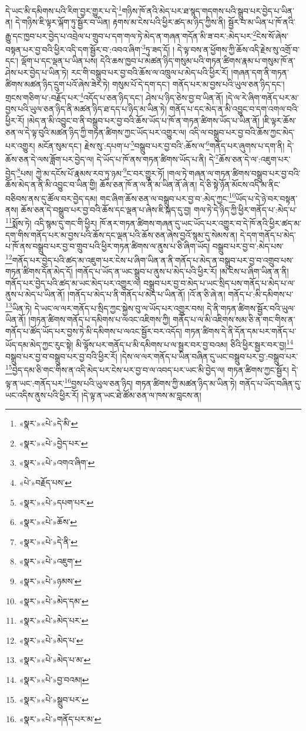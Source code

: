 དེ་ཡང་མི་དམིགས་པའི་རིག་བྱར་གྱུར་པ་དེ་\footnote{«སྣར་»«པེ་»དེ་མི་}གཉིས་ཁོ་ནའི་མེད་པར་ཐ་སྙད་གདགས་པའི་སྒྲུབ་པར་བྱེད་པ་ཡིན་ན། དེ་གཉིས་ཇི་ལྟར་ལྐོག་ཏུ་སྦྱོར་བ་ཡིན། རྟགས་མ་ངེས་པའི་ཕྱིར་ཚད་མ་ཉིད་ཀྱིས་ནི། སྦྱོར་བ་མ་ཡིན་པ་ཁོ་ནའི་རྒྱུ་དང་ཁྱབ་པར་བྱེད་པ་འབྲེལ་པ་གྲུབ་པ་དག་གལ་ཏེ་མེད་ན་གཞན་གདོན་མི་ཟ་བར་:མེད་པར་\footnote{«སྣར་»«པེ་»བྱེད་པར་}ངེས་སོ་ཞེས་བསྟན་པར་བྱ་བའི་ཕྱིར་འདི་དག་སྦྱོར་བ་:འབའ་ཞིག་\footnote{«སྣར་»«པེ་»འགའ་ཞིག་}ཏུ་ཟད་དོ། །
དེ་ལྟ་བས་ན་ཕྱོགས་ཀྱི་ཆོས་འདི་རྗེས་སུ་འགྲོ་བ་དང་། ལྡོག་པ་དང་ལྡན་པ་ཡིན་པས། དེའི་ཆས་ཁྱབ་པ་མཚན་ཉིད་གསུམ་པའི་གཏན་ཚིགས་རྣམ་པ་གསུམ་ཁོ་ན་ཤེས་པར་བྱེད་པ་ཡིན་ཏེ། རང་གི་བསྒྲུབ་པར་བྱ་བའི་ཆོས་ལ་འཁྲུལ་པ་མེད་པའི་ཕྱིར་རོ། །གཞན་དག་ནི་གཏན་ཚིགས་མཚན་ཉིད་དྲུག་པའོ་ཞེས་ཟེར་ཏེ། གསུམ་པོ་དེ་དག་དང་། གནོད་པར་མ་བྱས་པའི་ཡུལ་ཅན་ཉིད་དང་། གྲངས་གཅིག་པ་:བརྗོད་པར་\footnote{«པེ་»བརྗོད་པས་}འདོད་པ་ཅན་ཉིད་དང་། ཤེས་པ་ཉིད་ཅེས་བྱ་བ་ཡིན་ནོ། །དེ་ལ་རེ་ཞིག་གནོད་པར་མ་བྱས་པའི་ཡུལ་ཅན་ཉིད་ནི་མཚན་ཉིད་ཐ་དད་པ་ཉིད་མ་ཡིན་ཏེ། གནོད་པ་དང་མེད་ན་མི་འབྱུང་བ་དག་འགལ་བའི་ཕྱིར་རོ། །མེད་ན་མི་འབྱུང་བ་ནི་བསྒྲུབ་པར་བྱ་བའི་ཆོས་ཡོད་པ་ཁོ་ན་གཏན་ཚིགས་ཡོད་པ་ཡིན་ནོ། །ཇི་ལྟར་ཆོས་ཅན་ལ་དེ་ལྟ་བུའི་མཚན་ཉིད་ཀྱི་གཏན་ཚིགས་ཀྱང་ཡོད་པར་འགྱུར་ལ། འདི་ལ་བསྒྲུབ་པར་བྱ་བའི་ཆོས་ཀྱང་མེད་པར་འགྱུར། མངོན་སུམ་དང་། རྗེས་སུ་:དཔག་པ་\footnote{«སྣར་»«པེ་»དཔག་པར་}བསྒྲུབ་པར་བྱ་བའི་:ཆོས་ལ་\footnote{«སྣར་»«པེ་»ཆོས་}གནོད་པར་ཞུགས་པ་དག་ནི། དེ་ཆོས་ཅན་དེ་ལས་ཟློག་པར་བྱེད་ལ། དེ་ཡོད་པ་ཁོ་ནས་གཏན་ཚིགས་ཡོད་པ་ནི། དེ་\footnote{«སྣར་»«པེ་»དེ་ནི་}ཆོས་ཅན་དེ་ལ་:འཇུག་པར་བྱེད་\footnote{«སྣར་»«པེ་»འཇུག་}པས། ཀྱེ་མ་དངོས་པོ་རྣམས་རབ་ཏུ་ཉམ་\footnote{«སྣར་»«པེ་»ཉམས་}ང་བར་གྱུར་ཏོ། །གལ་ཏེ་གཞན་ལ་གཏན་ཚིགས་བསྒྲུབ་པར་བྱ་བའི་ཆོས་མེད་ན་ནི་མི་འབྱུང་བ་ཡིན་གྱི། ཆོས་ཅན་ཁོ་ན་ལ་ནི་མ་ཡིན་ནོ་ཞེ་ན། དེ་ཅི་སྟེ་ཉོན་མོངས་འདི་མ་ནིང་བཅིབས་ནས་དུ་ཚོལ་བར་བྱེད་དམ། གང་ཞིག་ཆོས་ཅན་ལ་བསྒྲུབ་པར་བྱ་བ་:མེད་ཀྱང་\footnote{«སྣར་»«པེ་»མེད་དམ་}ཡོད་པ་དེ་ཉེ་བར་བསྟན་ནས། ཆོས་ཅན་དེ་བསྒྲུབ་པར་བྱ་བའི་ཆོས་དང་ལྡན་པ་ཞེས་ཇི་སྐད་དུ་བྱ། གལ་ཏེ་དེ་ཉིད་ཀྱི་ཕྱིར་གནོད་པ་:མེད་པ་\footnote{«སྣར་»«པེ་»མེད་པར་}སྨོས་ཏེ། འདི་སྙམ་དུ་གང་གི་ཕྱིར། ཁོ་ནར་གཏན་ཚིགས་གཞན་དུ་ཡང་ཡོད་པར་འགྱུར་བ་དེ་ཁོ་ནའི་ཕྱིར་ཚད་མ་དག་གིས་གནོད་པར་མ་བྱས་པའི་ཆོས་དང་ལྡན་པའི་ཆོས་ཅན་ཞེས་བྱའོ་སྙམ་དུ་སེམས་ན། དེ་དག་གནོད་པ་མེད་པ་ཁོ་ནས་བསྒྲུབ་པར་བྱ་བ་གྲུབ་པའི་ཕྱིར་གཏན་ཚིགས་ལ་ནུས་པ་ཅི་ཞིག་ཡོད། བསྒྲུབ་པར་བྱ་བ་:མེད་པས་\footnote{«སྣར་»«པེ་»མེད་པ་}གནོད་པར་བྱེད་པའི་ཚད་མ་འཇུག་པར་ངེས་པ་ཞིག་ཡིན་ན་ནི་གནོད་པ་མེད་ན་བསྒྲུབ་པར་བྱ་བ་འགྲུབ་པས་གཏན་ཚིགས་དོན་མེད་དོ། །གནོད་པ་ཡོད་ན་ཡང་སྒྲུབ་པ་ནུས་པ་མེད་པའི་ཕྱིར་རོ། །མ་ངེས་པ་ཞིག་ཡིན་ན་ནི། གནོད་པར་བྱེད་པའི་ཚད་མ་ཡང་མེད་པར་འགྱུར་ལ། བསྒྲུབ་པར་བྱ་བ་མེད་པ་ཡང་སྲིད་པས་གནོད་པ་མེད་པ་ལ་ནུས་པ་མེད་པ་ཡིན་ནོ། །གནོད་པ་མེད་པ་ནི་གནོད་པ་མེད་པ་ཡིན་ནོ། །འོ་ན་ཅི་ཞེ་ན། གནོད་པ་:མི་དམིགས་པ་\footnote{«སྣར་»«པེ་»མེད་པ་མ་}ཡིན་ཏེ། དེ་ཡང་ལ་ལར་གནོད་པ་སྲིད་ཀྱང་སྐྱེས་བུ་ལ་ཡོད་པར་འགྱུར་བས། དེ་ནི་གཏན་ཚིགས་སྦྱོར་བའི་ཡུལ་ཡིན་ནོ། །གཏན་ཚིགས་གནོད་པ་དམིགས་པ་ལའང་འཇིགས་ཀྱི། གནོད་པ་ལ་མི་འཇིགས་སམ་ཅི་ན་གང་གིས་ན་གནོད་པ་ཚོད་ཡོད་པར་བྱས་ཏེ་མི་དམིགས་པ་ལའང་སྦྱོར་བར་འདོད། གཏན་ཚིགས་དེ་ནི་དོན་དམ་པར་གནོད་པ་ཡོད་དམ་མེད་ཀྱང་རུང་སྟེ། མི་ལྟོས་པར་གནོད་པ་མི་དམིགས་པ་ལ་སྦྱར་བར་བྱ་བའམ། ཅིའི་ཕྱིར་སྦྱར་བར་བྱ།\footnote{«སྣར་»«པེ་»བྱ་བའམ།} བསྒྲུབ་པར་བྱ་བ་བསྒྲུབ་པར་བྱ་བའི་ཕྱིར་རོ། །དེས་ལ་ལར་གནོད་པ་ཡིན་བཞིན་དུ་ཡང་བསྒྲུབ་པར་བྱ་:བསྒྲུབ་པར་\footnote{«སྣར་»«པེ་»སྒྲུབ་པར་}བྱེད་དམ་ཅི་གང་གིས་ན་འདི་མེད་པར་ངེས་པར་བྱ་བ་ལ་འབད་པར་ཡང་མི་བྱེད་ལ། གཏན་ཚིགས་ཀྱང་སྦྱོར། དེ་ལྟ་ན་ཡང་:གནོད་པར་\footnote{«སྣར་»«པེ་»གནོད་པར་མ་}བྱས་པའི་ཡུལ་ཅན་ཉིད། གཏན་ཚིགས་ཀྱི་མཚན་ཉིད་མ་ཡིན་ཏེ། གནོད་པ་ཡོད་བཞིན་དུ་ཡང་འདིས་ནུས་པའི་ཕྱིར་རོ། །དེ་ལྟ་ན་ཡང་ཐེ་ཚོམ་ཅན་ལ་ཁས་མ་བླངས་ན། 